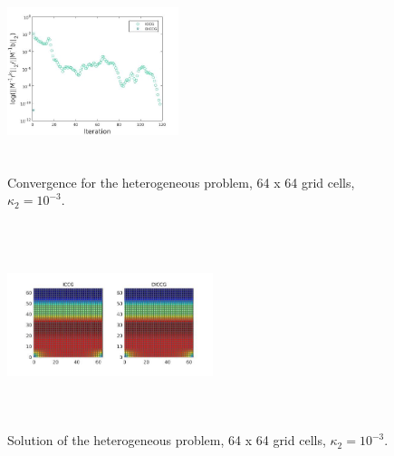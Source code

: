 \documentclass{ecmorXV}
\begin{document}
\begin{figure}[!h]
\centering
\begin{minipage}{.4\textwidth}
 \centering
\includegraphics[width=5cm,height=5cm,keepaspectratio]
{conv_he_2.jpg}
\caption{Convergence for the heterogeneous problem, 64 x 64 grid cells, $\kappa_2=10^{-3}$.}
\label{fig:convhe2}
\end{minipage}%
\hspace{3 pt}
\begin{minipage}{.4\textwidth}
 \centering
\includegraphics[width=6cm,height=6cm,keepaspectratio]
{sol_he_2.jpg}
\caption{Solution of the heterogeneous problem, 64 x 64 grid cells, $\kappa_2=10^{-3}$.}
\label{fig:solhe2}
\end{minipage}
\end{figure}
\end{document}
